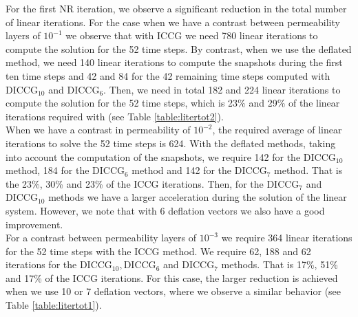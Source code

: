 \documentclass[12pt]{article}
\begin{document}
For the first NR iteration, we observe a significant reduction in the total number of linear iterations. For the 
case when we have a contrast between permeability layers of $10^{-1}$ we observe that with ICCG we need 780 linear 
iterations to compute the solution for the 52 time steps. By contrast, when we use the deflated method, we need 140 
linear iterations to compute the snapshots during the first ten time steps and 42 and 84 for the 42 remaining time 
steps computed with DICCG$_{10}$ and DICCG$_6$. Then, we need in total 182 and 224 linear iterations to compute the 
solution for the 52 time steps, which is 23\% and 29\% of the linear iterations required with (see Table 
\ref{table:litertot2}).\\
When we have a contrast in permeability of $10^{-2}$, the required average of linear iterations to solve the 52 
time steps is 624. With the deflated methods, taking into account the computation of the snapshots, we require 
142 for the DICCG$_{10}$ method, 184 for the DICCG$_6$ method and 142 for the DICCG$_7$ method. That is the 23\%, 30\% 
and 23\% of the ICCG iterations. Then, for the DICCG$_7$ and DICCG$_{10}$ methods we have a larger acceleration 
during the solution of the linear system. However, we note that with 6 deflation vectors we also have a good 
improvement.\\
For a contrast between permeability layers of $10^{-3}$ we require 364 linear iterations for the 52 time steps 
with the ICCG method. We require 62, 188 and 62 iterations for the DICCG$_{10}, $DICCG$_6$ and DICCG$_7$ methods. 
That is 17\%, 51\% and 17\% of the ICCG iterations. For this case, the larger reduction is achieved when we use 
10 or 7 deflation vectors, where we observe a similar behavior (see Table \ref{table:litertot1}).\\
\end{document}

